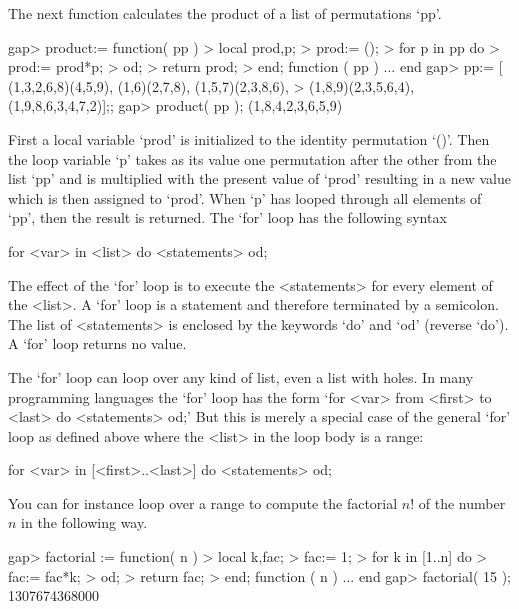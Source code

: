 
%
The next function calculates the product of a list of permutations `pp'.

\beginexample
    gap> product:= function( pp )
    >        local prod,p;
    >        prod:= ();        
    >        for p in pp do
    >          prod:= prod*p;    
    >        od;
    >        return prod;
    >    end;
    function ( pp ) ... end
    gap> pp:= [ (1,3,2,6,8)(4,5,9), (1,6)(2,7,8), (1,5,7)(2,3,8,6),
    >           (1,8,9)(2,3,5,6,4), (1,9,8,6,3,4,7,2)];;
    gap> product( pp );
    (1,8,4,2,3,6,5,9)
\endexample

First a  local variable `prod'  is initialized  to the identity permutation
`()'. Then the loop variable `p' takes as its value one permutation after
the other from the list `pp' and is multiplied with  the present value of
`prod'  resulting in a  new value which  is then assigned  to `prod'. When
`p' has looped through all elements of `pp', then the result is returned.
The `for' loop has the following syntax

\)\fmark for <var> in <list> do <statements> od;

The  effect of the `for'  loop  is to execute the <statements> for  every
element  of  the <list>.   A `for'  loop  is  a  statement  and therefore
terminated by a semicolon.  The list of <statements>  is enclosed by  the
keywords `do' and `od'  (reverse  `do').  A `for'  loop returns no value.

The `for' loop can loop over any kind of list, even a list with holes.
In many programming languages the `for' loop has the form `for <var> from 
<first> to <last> do <statements> od;' But this is merely a special case of 
the general `for' loop as defined above where the <list> in the loop body 
is a range:

\)\fmark for <var> in [<first>..<last>] do <statements>  od;

You can for  instance loop over a range to compute the factorial $n!$
of the number $n$ in the following way.

\beginexample
    gap> factorial := function( n )
    >        local k,fac;                    
    >        fac:= 1;
    >        for k in [1..n] do
    >          fac:= fac*k;
    >        od;
    >        return fac;
    >    end;
    function ( n ) ... end
    gap> factorial( 15 );
    1307674368000
\endexample

